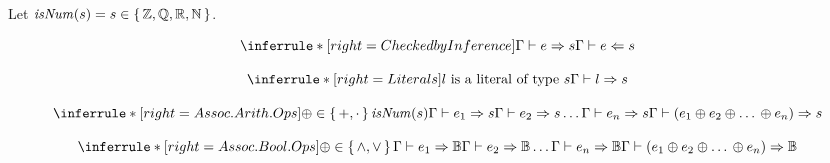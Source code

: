 \newcommand{\isNum}[1]{\mathit{isNum}(#1)}
Let \(\isNum{s} = s \in \set{\bb{Z}, \bb{Q}, \bb{R}, \bb{N}}\).

\newcommand{\newTypeRule}[4]{%
\begin{equation}%
      \inferrule*[right=#1]{#3}{#4}%
      \label{eq:tr:#2}%
\end{equation}%
}



\newTypeRule{Checked by Inference}{check}
      {\Gamma \vdash e \Rightarrow s}
      {\Gamma \vdash e \Leftarrow s}


\newTypeRule{Literals}{literals}
      {l~\text{is a literal of type}~s}
      {\Gamma \vdash l \Rightarrow s}


\newTypeRule{Assoc. Arith. Ops}{assocA}
      {\oplus \in \set{+, \cdot{}} \\ \isNum{s} \\\\%
       \Gamma \vdash e_1 \Rightarrow s \\ \Gamma \vdash e_2 \Rightarrow s \\ \ldots{} \\ \Gamma \vdash e_n \Rightarrow s}
      {\Gamma \vdash (e_1 \oplus e_2 \oplus \ldots{} \oplus e_n) \Rightarrow s}


\newTypeRule{Assoc. Bool. Ops}{assocB}
      {\oplus \in \set{\land{}, \lor{}} \\\\%
       \Gamma \vdash e_1 \Rightarrow \bb{B} \\ \Gamma \vdash e_2 \Rightarrow \bb{B} \\ \ldots{} \\ \Gamma \vdash e_n \Rightarrow \bb{B}}
      {\Gamma \vdash (e_1 \oplus e_2 \oplus \ldots{} \oplus e_n) \Rightarrow \bb{B}}

